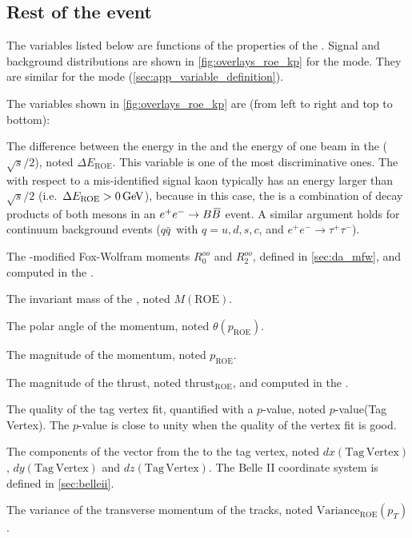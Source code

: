 \subsection{Rest of the event} \label{sec:var_roe}
The variables listed below are functions of the properties of the \ROE.
Signal and background distributions are shown in \cref{fig:overlays_roe_kp} for the \BKpnn mode.
They are similar for the \BKznn mode (\cref{sec:app_variable_definition}).

The variables shown in \cref{fig:overlays_roe_kp} are (from left to right and top to bottom):
\bi
\item The difference between the \roe energy in the \cms and the energy of one beam in the \cms ($\sqrt{s}/2$), noted $\Delta E_{\mathrm{ROE}}$.
This variable is one of the most discriminative ones.
The \ROE with respect to a mis-identified signal kaon typically has an energy larger than $\sqrt{s}/2$ (i.e.~$\Delta E_{\mathrm{ROE}}>0\mathrm{\,Ge\kern -0.1em V}$), because in this case, the \ROE is a combination of decay products of both \B mesons in an $e^+e^-\rightarrow B\kern 0.18em\overline{\kern -0.18em B}{}$ event.
A similar argument holds for continuum background events (\epem\to $q\bar{q}\,$ with $q=u,d,s,c$, and $e^+e^- \to \tau^{+} \tau^{-}$).
\item The \ROE-\ROE modified Fox-Wolfram moments $R^{oo}_{0}$ and $R^{oo}_{2}$, defined in \cref{sec:da_mfw}, and computed in the \CMS.
\item The invariant mass of the \roe, noted $M(\mathrm{ROE})$.
\item The polar angle of the \roe momentum, noted $\theta(p_{\mathrm{ROE}})$.
\item The magnitude of the \roe momentum, noted $p_{\mathrm{ROE}}$.
\item The magnitude of the \roe thrust, noted $\mathrm{thrust_{ROE}}$, and computed in the \cms.
\item The quality of the tag vertex fit, quantified with a $p$-value, noted $p$-value(Tag Vertex).
The $p$-value is close to unity when the quality of the vertex fit is good.
\item The components of the vector from the \IP to the tag vertex, noted $dx(\mathrm{Tag\,Vertex})$, $dy(\mathrm{Tag\,Vertex})$ and $dz(\mathrm{Tag\,Vertex})$.
The Belle II coordinate system is defined in \cref{sec:belleii}.
\item The variance of the transverse momentum of the \ROE tracks, noted $\mathrm{Variance_{ROE}}(p_T)$.
\ei

